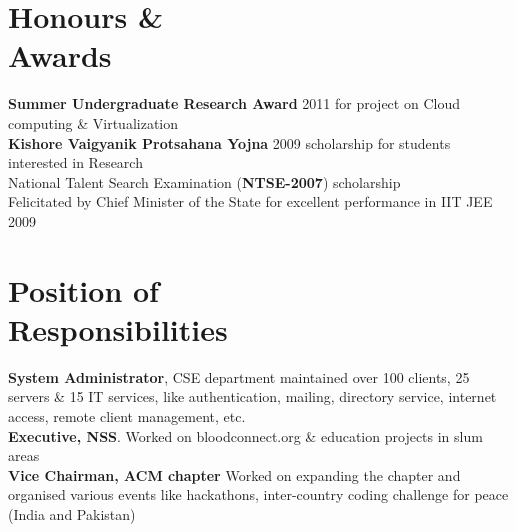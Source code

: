 \documentclass[margin,line]{resume}
\begin{document}
\begin{resume}
    \section{\mysidestyle Honours \&\\Awards} 
    \textbf{Summer Undergraduate Research Award} 2011 for project on Cloud computing \& Virtualization\vspace{1mm}\\%
    \textbf{Kishore Vaigyanik Protsahana Yojna} 2009 scholarship for students interested in Research\vspace{1mm}\\%
    National Talent Search Examination (\textbf{NTSE-2007}) scholarship\vspace{1mm}\\%
    Felicitated by Chief Minister of the State for excellent performance in IIT JEE 2009 
    
    \section{\mysidestyle Position of \\Responsibilities}
    \textbf{System Administrator}, CSE department maintained over 100 clients, 25 servers \& 15 IT services, like authentication, mailing, directory service, internet access, remote client management, etc.\\
    \textbf{Executive, NSS}. Worked on bloodconnect.org \& education projects in slum areas\\
    \textbf{Vice Chairman, ACM chapter} Worked on expanding the chapter and organised various events like hackathons, inter-country coding challenge for peace (India and Pakistan)\\

\end{resume}
\end{document}
